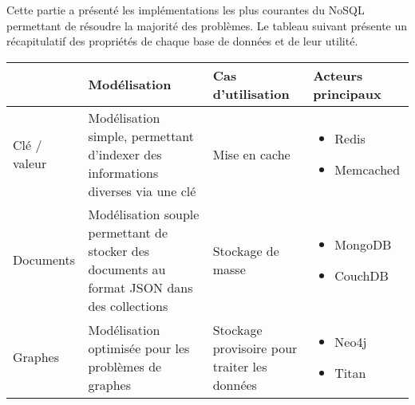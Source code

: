 Cette partie a présenté les implémentations les plus courantes du NoSQL permettant de résoudre la majorité des problèmes. Le tableau suivant présente un récapitulatif des propriétés de chaque base de données et de leur utilité.\\

\begin{tabular}{|p{}|p{}|p{}|p{}|}
	\hline
	& Modélisation & Cas d'utilisation & Acteurs principaux \\\hline
	Clé / valeur
	& Modélisation simple, permettant d'indexer des informations diverses via une clé
	& Mise en cache
	& \begin{itemize}
		\item Redis
		\item Memcached
	\end{itemize} \\\hline
	Documents
	& Modélisation souple permettant de stocker des documents au format JSON dans des collections
	& Stockage de masse
	& \begin{itemize}
		\item MongoDB
		\item CouchDB
	\end{itemize} \\\hline
	Graphes
	& Modélisation optimisée pour les problèmes de graphes
	& Stockage provisoire pour traiter les données
	& \begin{itemize}
		\item Neo4j
		\item Titan
	\end{itemize} \\\hline
\end{tabular}
